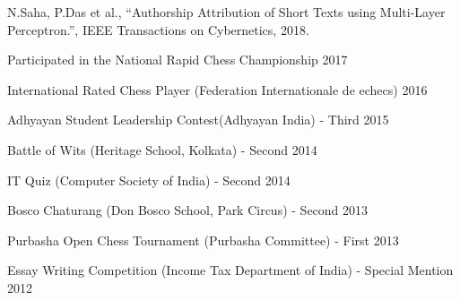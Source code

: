 \documentclass[10pt, letterpaper]{deps1}
\begin{document}
\small{\begin{tightitemize}
    \item N.Saha, P.Das et al., ``Authorship Attribution of Short Texts using Multi-Layer Perceptron.'', IEEE Transactions on \mbox{Cybernetics}, 2018.
\end{tightitemize}}

\vspace{5pt}
\begin{tightitemize}
	\item Participated in the National Rapid Chess Championship \hfill{2017}
	\item International Rated Chess Player (Federation Internationale de echecs) \hfill{2016}
	\item Adhyayan Student Leadership Contest(Adhyayan India) - Third \hfill{2015}
	\item Battle of Wits (Heritage School, Kolkata) - Second \hfill{2014}
	\item IT Quiz (Computer Society of India) - Second \hfill{2014}
	\item Bosco Chaturang (Don Bosco School, Park Circus) - Second \hfill{2013}
	\item Purbasha Open Chess Tournament (Purbasha Committee) - First \hfill{2013}
	\item Essay Writing Competition (Income Tax Department of India) - Special Mention \hfill{2012}
\end{tightitemize}
\end{document}
